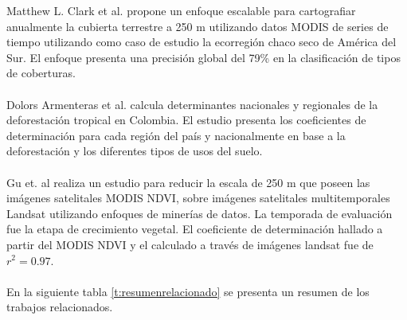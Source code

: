 Matthew L. Clark et al. \cite{clark2010scalable} propone un enfoque escalable para cartografiar anualmente la cubierta terrestre a 250 m utilizando datos MODIS de series de tiempo utilizando como caso de estudio la ecorregi\'on chaco seco de Am\'erica del Sur. El enfoque presenta una precisi\'on global del 79\% en la clasificaci\'on de tipos de coberturas.\\~\\
Dolors Armenteras et al. \cite{armenteras2013national} calcula determinantes nacionales y regionales de la deforestaci\'on tropical en Colombia. El estudio presenta los coeficientes de determinaci\'on para cada regi\'on del pa\'is y nacionalmente en base a la deforestaci\'on y los diferentes tipos de usos del suelo.\\~\\
Gu et. al \cite{gu2015downscaling} realiza un estudio para reducir la escala de 250 m que poseen las im\'agenes satelitales MODIS NDVI, sobre im\'agenes satelitales multitemporales Landsat utilizando enfoques de miner\'ias de datos. La temporada de evaluaci\'on fue la etapa de crecimiento vegetal. El coeficiente de determinaci\'on hallado a partir del MODIS NDVI y el calculado a trav\'es de im\'agenes landsat fue de $ r^{2}=0.97 $.\\~\\
En la siguiente tabla \ref{t:resumenrelacionado} se presenta un resumen de los trabajos relacionados.
